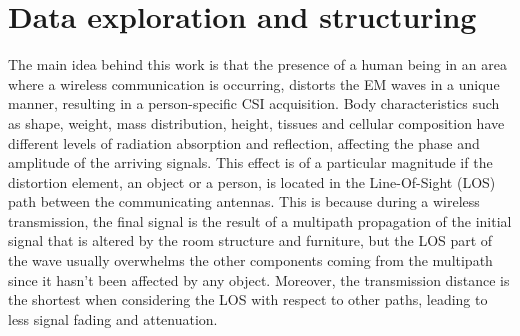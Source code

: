 \documentclass[binding=0.7cm, oneside]{sapthesis}
\begin{document}
\section{Data exploration and structuring}
\label{Sec:structuring}
The main idea behind this work is that the presence of a human being in an area where a wireless communication is occurring,
distorts the EM waves in a unique manner, resulting in a person-specific CSI acquisition. Body characteristics such as shape, weight, mass distribution,
height, tissues and cellular composition have different levels of radiation absorption and reflection, affecting the phase and amplitude of the arriving signals.
This effect is of a particular magnitude if the distortion element, an object or a person, is located in the Line-Of-Sight (LOS) path between the communicating antennas.
This is because during a wireless transmission, the final signal is the result of a multipath propagation of the initial signal that is altered by the room structure and furniture,
but the LOS part of the wave usually overwhelms the other components coming from the multipath since it hasn't been affected by any object. Moreover, the transmission distance is the shortest
when considering the LOS with respect to other paths, leading to less signal fading and attenuation.
\end{document}
